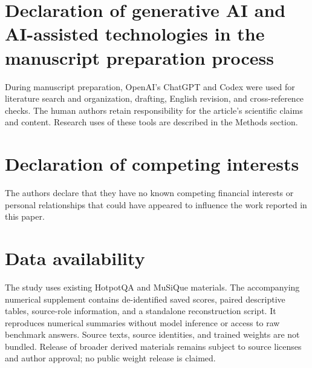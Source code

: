 \documentclass[preprint,12pt]{elsarticle}
\begin{document}
\section*{Declaration of generative AI and AI-assisted technologies in the manuscript preparation process}
During manuscript preparation, OpenAI's ChatGPT and Codex were used for literature search and organization, drafting, English revision, and cross-reference checks. The human authors retain responsibility for the article's scientific claims and content. Research uses of these tools are described in the Methods section.

\section*{Declaration of competing interests}
The authors declare that they have no known competing financial interests or personal relationships that could have appeared to influence the work reported in this paper.

\section*{Data availability}
The study uses existing HotpotQA and MuSiQue materials. The accompanying numerical supplement contains de-identified saved scores, paired descriptive tables, source-role information, and a standalone reconstruction script. It reproduces numerical summaries without model inference or access to raw benchmark answers. Source texts, source identities, and trained weights are not bundled. Release of broader derived materials remains subject to source licenses and author approval; no public weight release is claimed.



\end{document}
